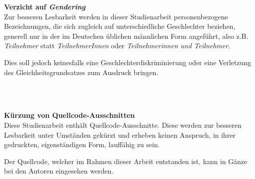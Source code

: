 \vfill
\textbf{Verzicht auf \textit{Gendering}} \\
Zur besseren Lesbarkeit werden in dieser Studienarbeit personenbezogene Bezeichnungen, die sich zugleich auf unterschiedliche Geschlechter beziehen, generell nur in der im Deutschen üblichen männlichen Form angeführt, also z.B. \textit{Teilnehmer} statt \textit{TeilnehmerInnen} oder \textit{Teilnehmerinnen und Teilnehmer}.

Dies soll jedoch keinesfalls eine Geschlechterdiskriminierung oder eine Verletzung des Gleichheitsgrundsatzes zum Ausdruck bringen.

\\\

\textbf{Kürzung von Quellcode-Ausschnitten} \\
Diese Studienarbeit enthält Quellcode-Ausschnitte. Diese werden zur besseren Lesbarkeit unter Umständen gekürzt und erheben keinen Anspruch, in ihrer gedruckten, eigenständigen Form, lauffähig zu sein.

Der Quellcode, welcher im Rahmen dieser Arbeit entstanden ist, kann in Gänze bei den Autoren eingesehen werden.

\vfill